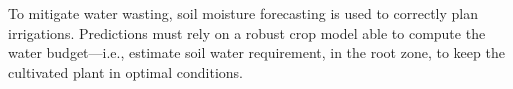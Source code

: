 

To mitigate water wasting, soil moisture forecasting is used to correctly plan irrigations.
Predictions must rely on a robust crop model able to compute the water budget---i.e., estimate soil water requirement, in the root zone, to keep the cultivated plant in optimal conditions.


